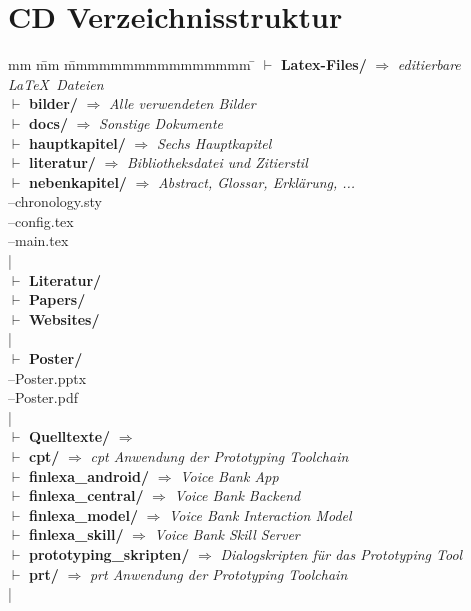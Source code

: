 \section{CD Verzeichnisstruktur}
\label{sec:cd-verzeichnisstruktur}
\begin{tabbing}
	mm \= mm \= mmmmmmmmmmmmmmmm \= \kill
    $\vdash$ \textbf{Latex-Files/} $\Rightarrow$ \textit{editierbare \LaTeX~Dateien}\\ %
	\> \>  $\vdash$  \textbf{bilder/}   	\> $\Rightarrow$ \textit{Alle verwendeten Bilder}\\
	\> \>  $\vdash$  \textbf{docs/}   	\> $\Rightarrow$ \textit{Sonstige Dokumente}\\
	\> \>  $\vdash$  \textbf{hauptkapitel/}  \> $\Rightarrow$ \textit{Sechs Hauptkapitel}\\
	\> \>  $\vdash$  \textbf{literatur/}   \> $\Rightarrow$ \textit{Bibliotheksdatei und Zitierstil}\\
	\> \>  $\vdash$  \textbf{nebenkapitel/}   \> $\Rightarrow$ \textit{Abstract, Glossar, Erklärung, ...}\\
	\> \> --chronology.sty\\
	\> \> --config.tex\\
	\> \> --main.tex\\
	|\\
	$\vdash$ \textbf{Literatur/} \\ 
	\> \>  $\vdash$  \textbf{Papers/} \\
	\> \>  $\vdash$  \textbf{Websites/} \\ 
	|\\
	$\vdash$ \textbf{Poster/} \\
	\> \>  --Poster.pptx\\
	\> \>  --Poster.pdf\\
	|\\
	$\vdash$ \textbf{Quelltexte/} $\Rightarrow$\\ %
	\> \>  $\vdash$  \textbf{cpt/}   	\> $\Rightarrow$ \textit{cpt Anwendung der Prototyping Toolchain}\\
	\> \>  $\vdash$  \textbf{finlexa\_android/}   	\> $\Rightarrow$ \textit{Voice Bank App}\\
	\> \>  $\vdash$  \textbf{finlexa\_central/}   	\> $\Rightarrow$ \textit{Voice Bank Backend}\\
	\> \>  $\vdash$  \textbf{finlexa\_model/}   	\> $\Rightarrow$ \textit{Voice Bank Interaction Model}\\
	\> \>  $\vdash$  \textbf{finlexa\_skill/}  \> $\Rightarrow$ \textit{Voice Bank Skill Server}\\
	\> \>  $\vdash$  \textbf{prototyping\_skripten/}  \> $\Rightarrow$ \textit{Dialogskripten für das Prototyping Tool}\\
	\> \>  $\vdash$  \textbf{prt/}   	\> $\Rightarrow$ \textit{prt Anwendung der Prototyping Toolchain}\\
    |\\
\end{tabbing}

